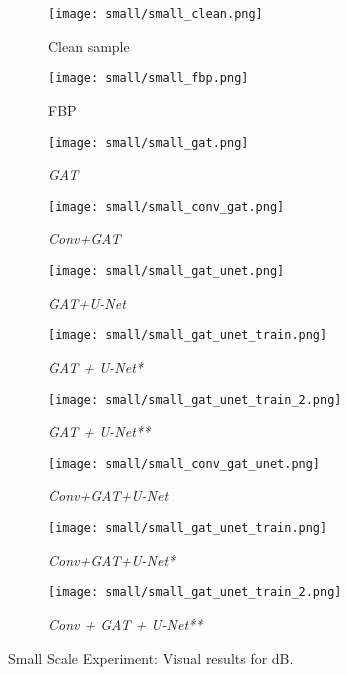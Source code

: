 \begin{figure}[H]
  \captionsetup[subfigure]{justification=centering}
  \centering
  \begin{subfigure}[t]{0.16\textwidth}
    \texttt{[image: small/small\_clean.png]}
    \caption{Clean sample}
    \label{fig:small_clean_sample_overview}
  \end{subfigure} \hfill
  \begin{subfigure}[t]{0.16\textwidth}
    \texttt{[image: small/small\_fbp.png]}
    \caption{FBP}
  \end{subfigure} \hfill
  \begin{subfigure}[t]{0.16\textwidth}
    \texttt{[image: small/small\_gat.png]}
    \caption{\textit{GAT}}
  \end{subfigure} \hfill
  \begin{subfigure}[t]{0.16\textwidth}
    \texttt{[image: small/small\_conv\_gat.png]}
    \caption{\textit{Conv+GAT}}
  \end{subfigure} \hfill
  \begin{subfigure}[t]{0.16\textwidth}
    \texttt{[image: small/small\_gat\_unet.png]}
    \caption{\textit{GAT+U-Net}}
  \end{subfigure}

  \begin{subfigure}[t]{0.16\textwidth}
    \texttt{[image: small/small\_gat\_unet\_train.png]}
    \caption{\textit{GAT + U-Net*}}
  \end{subfigure} \hfill
  \begin{subfigure}[t]{0.16\textwidth}
    \texttt{[image: small/small\_gat\_unet\_train\_2.png]}
    \caption{\textit{GAT + U-Net**}}
  \end{subfigure} \hfill
  \begin{subfigure}[t]{0.16\textwidth}
    \texttt{[image: small/small\_conv\_gat\_unet.png]}
    \caption{\textit{Conv+GAT+U-Net}}
  \end{subfigure} \hfill
  \begin{subfigure}[t]{0.16\textwidth}
    \texttt{[image: small/small\_gat\_unet\_train.png]}
    \caption{\textit{Conv+GAT+U-Net*}}
  \end{subfigure} \hfill
  \begin{subfigure}[t]{0.16\textwidth}
    \texttt{[image: small/small\_gat\_unet\_train\_2.png]}
    \caption{\textit{Conv + GAT + U-Net**}}
  \end{subfigure}
  \caption{Small Scale Experiment: Visual results for  dB.}
  \label{fig:small_components_overview}
\end{figure}

